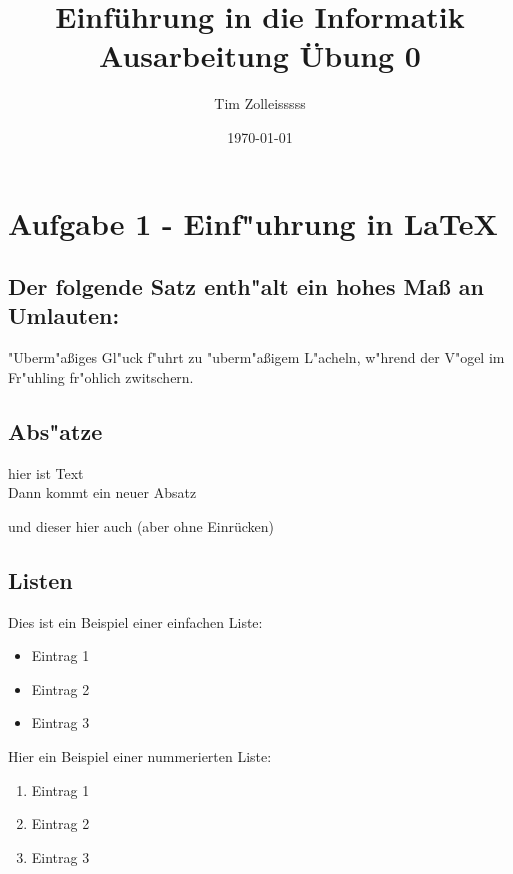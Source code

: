 \documentclass[a4paper,11pt,titlepage]{article}
\begin{document}
    \title{Einf\"uhrung in die Informatik\\
    Ausarbeitung \"Ubung 0}


    \author{Tim Zolleisssss}


    \date{\today}

    \maketitle{\thispagestyle{plain}}


    \section{Aufgabe 1 - Einf"uhrung in \LaTeX}

    \subsection{Der folgende Satz enth"alt ein hohes Maß an Umlauten:}

    "Uberm"aßiges Gl"uck f"uhrt zu "uberm"aßigem L"acheln, w"hrend der V"ogel im Fr"uhling fr"ohlich zwitschern.

    \subsection{Abs"atze}
    hier ist Text \\

    Dann kommt ein neuer Absatz\newline

    \noindent und dieser hier auch (aber ohne Einr\"ucken)

    \subsection{Listen}

    Dies ist ein Beispiel einer einfachen Liste:
    \begin{itemize}
        \item Eintrag 1
        \item Eintrag 2
        \item Eintrag 3
    \end{itemize}

    \noindent Hier ein Beispiel einer nummerierten Liste:
    \begin{enumerate}
        \item Eintrag 1
        \item Eintrag 2
        \item Eintrag 3
    \end{enumerate}
\end{document}
